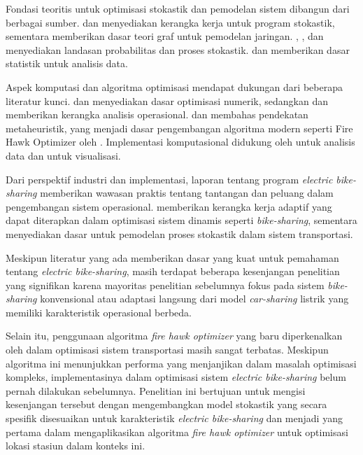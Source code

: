 Fondasi teoritis untuk optimisasi stokastik dan pemodelan sistem dibangun dari berbagai sumber.  dan  menyediakan kerangka kerja untuk program stokastik, sementara  memberikan dasar teori graf untuk pemodelan jaringan. , , dan  menyediakan landasan probabilitas dan proses stokastik.  dan  memberikan dasar statistik untuk analisis data.

Aspek komputasi dan algoritma optimisasi mendapat dukungan dari beberapa literatur kunci.  dan  menyediakan dasar optimisasi numerik, sedangkan  dan  memberikan kerangka analisis operasional.  dan  membahas pendekatan metaheuristik, yang menjadi dasar pengembangan algoritma modern seperti Fire Hawk Optimizer oleh . Implementasi komputasional didukung oleh  untuk analisis data dan  untuk visualisasi.

Dari perspektif industri dan implementasi, laporan  tentang program \textit{electric bike-sharing} memberikan wawasan praktis tentang tantangan dan peluang dalam pengembangan sistem operasional.  memberikan kerangka kerja adaptif yang dapat diterapkan dalam optimisasi sistem dinamis seperti \textit{bike-sharing}, sementara  menyediakan dasar untuk pemodelan proses stokastik dalam sistem transportasi.

Meskipun literatur yang ada memberikan dasar yang kuat untuk pemahaman tentang \textit{electric bike-sharing}, masih terdapat beberapa kesenjangan penelitian yang signifikan karena mayoritas penelitian sebelumnya fokus pada sistem \textit{bike-sharing} konvensional atau adaptasi langsung dari model \textit{car-sharing} listrik yang memiliki karakteristik operasional berbeda.

Selain itu, penggunaan algoritma \textit{fire hawk optimizer} yang baru diperkenalkan oleh  dalam optimisasi sistem transportasi masih sangat terbatas. Meskipun algoritma ini menunjukkan performa yang menjanjikan dalam masalah optimisasi kompleks, implementasinya dalam optimisasi sistem \textit{electric bike-sharing} belum pernah dilakukan sebelumnya. Penelitian ini bertujuan untuk mengisi kesenjangan tersebut dengan mengembangkan model stokastik yang secara spesifik disesuaikan untuk karakteristik \textit{electric bike-sharing} dan menjadi yang pertama dalam mengaplikasikan algoritma \textit{fire hawk optimizer} untuk optimisasi lokasi stasiun dalam konteks ini.

